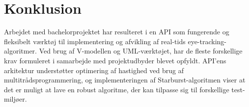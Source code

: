 \documentclass[rapport.tex]{subfiles}
\begin{document}
\section{Konklusion}
	Arbejdet med bachelorprojektet har resulteret i en API som fungerende og fleksibelt værktøj til implementering og afvikling af real-tids eye-tracking-algoritmer. Ved brug af V-modellen og UML-værktøjet, har de fleste forskellige krav formuleret i samarbejde med projektudbyder blevet opfyldt.
	API'ens arkitektur understøtter optimering af hastighed ved brug af multitrådsprogrammering, og implementeringen af Starburst-algoritmen viser at det er muligt at lave en robust algoritme, der kan tilpasse sig til forskellige test-miljøer. 
		
\end{document}
